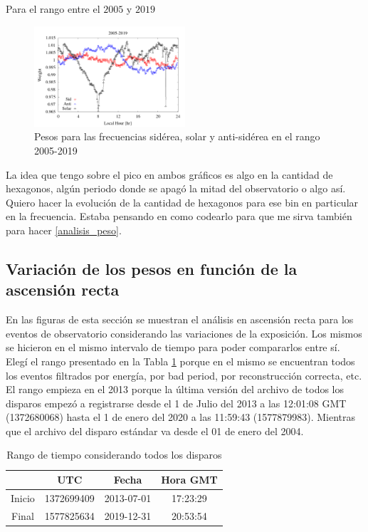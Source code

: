 Para el rango entre el $2005$ y $2019$
\begin{figure}[H]
	\centering
	\includegraphics[width=0.5\textwidth]{Graficos/weigth2005-2019.png}
	\caption{Pesos para las frecuencias sidérea, solar y anti-sidérea en el rango 2005-2019}
	\label{fig:pesos_2019}
\end{figure}




La idea que tengo sobre el pico en ambos gráficos es algo en la cantidad de hexagonos, algún periodo donde se apagó la mitad del observatorio o algo así. Quiero hacer la evolución de la cantidad de hexagonos para ese bin en particular en la frecuencia. Estaba pensando en como codearlo para que me sirva también para hacer \ref{analisis_peso}.




\subsection{Variación de los pesos en función de la ascensión recta}
En las figuras de esta sección se muestran el análisis en ascensión recta para los eventos de observatorio considerando las variaciones de la exposición. 
Los mismos se hicieron en el mismo intervalo de tiempo para poder compararlos entre sí. Elegí el rango presentado en la Tabla \ref{rango_corto}  porque en el mismo se encuentran todos los eventos filtrados por energía, por bad period, por reconstrucción correcta, etc. El rango empieza en el 2013 porque la última versión del archivo de todos los disparos empezó a registrarse desde el  1 de Julio del 2013 a las 12:01:08 GMT (1372680068) hasta el  1 de enero del 2020 a las 11:59:43 (1577879983). Mientras que el archivo del disparo estándar va desde el 01 de enero del 2004.

	\begin{table}[H]
	\centering
		\begin{tabular}{c|c|c|c}
	 		& UTC 			& Fecha		 	&  Hora GMT  \\ \hline
	Inicio	& 1372699409	&2013-07-01 	&17:23:29		\\
	Final 	& 1577825634	&2019-12-31 	&20:53:54		\\
		\end{tabular}
	\caption{Rango de tiempo considerando todos los disparos} 	\label{rango_corto}
	\end{table}


